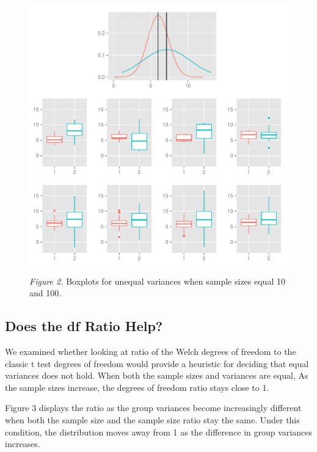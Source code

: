 \documentclass[man,a4paper,noextraspace,apacite]{apa6}\usepackage[]{graphicx}\usepackage[]{color}
\makeatletter
\def\maxwidth{ %
  \ifdim\Gin@nat@width>\linewidth
    \linewidth
  \else
    \Gin@nat@width
  \fi
}
\newenvironment{knitrout}{}{} %
\makeatother
\begin{document}
\begin{figure}
\begin{knitrout}
\color{fgcolor}
\includegraphics[width=\maxwidth]{figure/varDifferentBoxplots} 

\end{knitrout}
\textit{Figure 2.} Boxplots for unequal variances when sample sizes equal 10 and 100.
\end{figure}


\subsection{Does the df Ratio Help?}
    We examined whether looking at ratio of the Welch degrees of freedom to the classic t test degrees of freedom would provide a heuristic for deciding that equal variances does not hold. When both the sample sizes and variances are equal,  As the sample sizes increase, the degrees of freedom ratio stays close to 1. 

    Figure 3 displays the ratio as the group variances become increasingly different when both the sample size and the sample size ratio stay the same. Under this condition, the distribution moves away from 1 as the difference in group variances increases.
\end{document}
